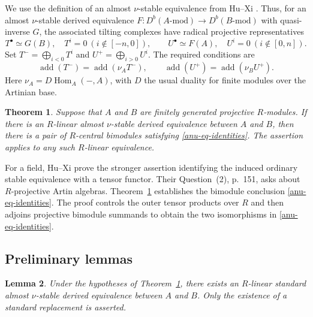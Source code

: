 \documentclass[12pt,a4paper,english,reqno]{amsart}
\numberwithin{equation}{section}
\theoremstyle{plain}
\newtheorem{theorem}{Theorem}[section]
\newtheorem{lemma}[theorem]{Lemma}
\theoremstyle{definition}
\begin{document}
We use the definition of an almost $\nu$-stable equivalence from
Hu--Xi \cite{HuXi2010}.  Thus, for an almost $\nu$-stable derived equivalence
$F:D^b(A\text{-}\mathrm{mod})\longrightarrow
D^b(B\text{-}\mathrm{mod})$ with quasi-inverse $G$, the associated
tilting complexes have radical projective representatives
\[
 T^\bullet\simeq G(B),\quad T^i=0\ (i\notin[-n,0]),
 \qquad
 U^\bullet\simeq F(A),\quad U^i=0\ (i\notin[0,n]).
\]
Set $T^- =\bigoplus_{i<0}T^i$ and
$U^+=\bigoplus_{i>0}U^i$.  The required conditions are
\begin{equation}\label{anu-eq-almost-nu}
 \operatorname{add}(T^-)=\operatorname{add}(\nu_A T^-),
 \qquad
 \operatorname{add}(U^+)=\operatorname{add}(\nu_B U^+).
\end{equation}
Here $\nu_A=D\operatorname{Hom}_A(-,A)$, with $D$ the usual
duality for finite modules over the Artinian base.

\begin{theorem}\label{anu-thm-raw-semt}
Suppose that $A$ and $B$ are finitely generated projective $R$-modules.
If there is an $R$-linear almost $\nu$-stable derived equivalence
between $A$ and $B$, then there is a pair of $R$-central bimodules
satisfying \eqref{anu-eq-identities}.
The assertion applies to any such $R$-linear equivalence.
\end{theorem}

For a field, Hu--Xi \cite[Theorem~5.3, pp.~141--143]{HuXi2010}
prove the stronger assertion identifying the induced ordinary stable
equivalence with a tensor functor.  Their Question~(2), p.~151, asks
about $R$-projective Artin algebras.  Theorem~\ref{anu-thm-raw-semt} establishes the bimodule conclusion
\eqref{anu-eq-identities}.  The proof controls the outer tensor products over $R$ and
then adjoins projective bimodule summands to obtain the two
isomorphisms in \eqref{anu-eq-identities}.

\subsection{Preliminary lemmas}

\begin{lemma}\label{anu-lem-standard-replacement}
Under the hypotheses of Theorem~\ref{anu-thm-raw-semt}, there exists
an $R$-linear standard almost $\nu$-stable derived equivalence between
$A$ and $B$.
Only the existence of a standard replacement is asserted.
\end{lemma}
\end{document}
